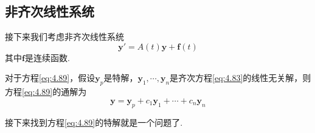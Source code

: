 \subsection{非齐次线性系统}\label{sec:4.11}

接下来我们考虑非齐次线性系统
\begin{equation}\label{eq:4.89}
    \mathbf{y}'=A(t)\mathbf{y}+\mathbf{f}(t)
\end{equation}
其中$\mathbf{f}$是连续函数.

\begin{theorem}
    对于方程\ref{eq:4.89}，假设$\mathbf{y}_p$是特解，$\mathbf{y}_1,\cdots,\mathbf{y}_n$是齐次方程\ref{eq:4.83}的线性无关解，则方程\ref{eq:4.89}的通解为
    \[
        \mathbf{y}=\mathbf{y}_p+c_1\mathbf{y}_1+\cdots+c_n\mathbf{y}_n
    \]
\end{theorem}

接下来找到方程\ref{eq:4.89}的特解就是一个问题了.

